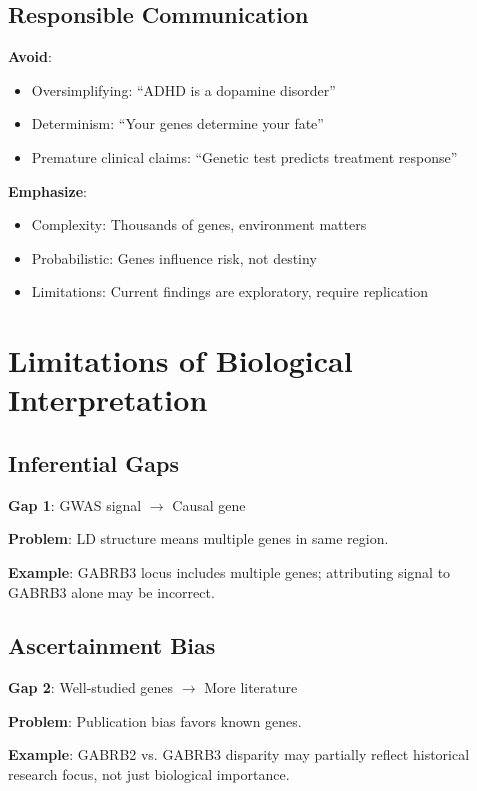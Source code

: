 \documentclass[12pt,letterpaper]{article}
\begin{document}
\subsection{Responsible Communication}

\textbf{Avoid}:
\begin{itemize}
    \item Oversimplifying: ``ADHD is a dopamine disorder''
    \item Determinism: ``Your genes determine your fate''
    \item Premature clinical claims: ``Genetic test predicts treatment response''
\end{itemize}

\textbf{Emphasize}:
\begin{itemize}
    \item Complexity: Thousands of genes, environment matters
    \item Probabilistic: Genes influence risk, not destiny
    \item Limitations: Current findings are exploratory, require replication
\end{itemize}

\section{Limitations of Biological Interpretation}

\subsection{Inferential Gaps}

\textbf{Gap 1}: GWAS signal $\rightarrow$ Causal gene

\textbf{Problem}: LD structure means multiple genes in same region.

\textbf{Example}: GABRB3 locus includes multiple genes; attributing signal to GABRB3 alone may be incorrect.

\subsection{Ascertainment Bias}

\textbf{Gap 2}: Well-studied genes $\rightarrow$ More literature

\textbf{Problem}: Publication bias favors known genes.

\textbf{Example}: GABRB2 vs. GABRB3 disparity may partially reflect historical research focus, not just biological importance.
\end{document}
